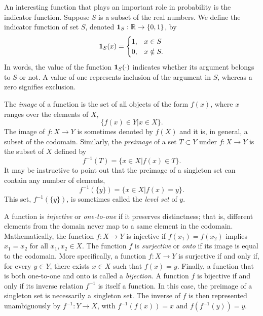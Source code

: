 \begin{example}
An interesting function that plays an important role in probability is the indicator function.
Suppose $S$ is a subset of the real numbers.
We define the indicator function of set $S$, denoted $\mathbf{1}_S: \mathbb{R} \rightarrow \{ 0, 1 \}$, by
\begin{equation*}
\mathbf{1}_S (x) = \begin{cases} 1, & x \in S\\
0, & x \notin S . \end{cases}
\end{equation*}
In words, the value of the function $\mathbf{1}_S (\cdot)$ indicates whether its argument belongs to $S$ or not.
A value of one represents inclusion of the argument in $S$, whereas a zero signifies exclusion.
\end{example}

The \emph{image} of a function is the set of all objects of the form $f(x)$, where $x$ ranges over the elements of $X$,
\begin{equation*}
\{ f(x) \in Y | x \in X \} .
\end{equation*}
The image of $f: X \rightarrow Y$ is sometimes denoted by $f(X)$ and it is, in general, a subset of the codomain.
Similarly, the \emph{preimage} of a set $T \subset Y$ under $f: X \rightarrow Y$ is the subset of $X$ defined by
\begin{equation*}
f^{-1} (T) = \{ x \in X | f(x) \in T \} .
\end{equation*}
It may be instructive to point out that the preimage of a singleton set can contain any number of elements,
\begin{equation*}
f^{-1} (\{ y \}) = \{ x \in X | f(x) = y \} .
\end{equation*}
This set, $f^{-1} (\{ y \})$, is sometimes called the \emph{level set} of $y$.

A function is \emph{injective} or \emph{one-to-one} if it preserves distinctness;
that is, different elements from the domain never map to a same element in the codomain.
Mathematically, the function $f: X \rightarrow Y$ is injective if $f(x_1) = f(x_2)$ implies $x_1 = x_2$ for all $x_1, x_2 \in X$.
The function $f$ is \emph{surjective} or \emph{onto} if its image is equal to the codomain.
More specifically, a function $f: X \rightarrow Y$ is surjective if and only if, for every $y \in Y$, there exists $x \in X$ such that $f(x) = y$.
Finally, a function that is both one-to-one and onto is called a \emph{bijection}.
A function $f$ is bijective if and only if its inverse relation $f^{-1}$ is itself a function.
In this case, the preimage of a singleton set is necessarily a singleton set.
The inverse of $f$ is then represented unambiguously by $f^{-1}: Y \rightarrow X$,
with $f^{-1} (f(x)) = x$ and $f (f^{-1} (y)) = y$.


